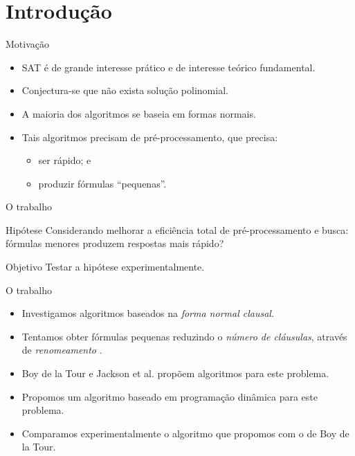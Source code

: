 
\section{Introdução}

\begin{frame}{Motivação}
	\begin{itemize}
		\item SAT é de grande interesse prático \pause e de interesse teórico fundamental.
		\pause\item Conjectura-se que não exista solução polinomial.
		\pause\item A maioria dos algoritmos se baseia em formas normais.
		\pause\item Tais algoritmos precisam de pré-processamento\pause, que precisa:
		\begin{itemize}
			\pause\item ser rápido\pause; e
			\item produzir fórmulas ``pequenas''.
		\end{itemize}
	\end{itemize}
\end{frame}

\begin{frame}{O trabalho}
	\begin{block}{Hipótese}
		Considerando melhorar a eficiência total de pré-processamento e busca: fórmulas menores produzem respostas mais rápido?
	\end{block}
	\pause
	\begin{block}{Objetivo}
		Testar a hipótese experimentalmente.
	\end{block}
\end{frame}

\begin{frame}{O trabalho}
	\begin{itemize}
		\item Investigamos algoritmos baseados na \emph{forma normal clausal}.
		\pause\item Tentamos obter fórmulas pequenas reduzindo o \emph{número de cláusulas}\pause, através de \emph{renomeamento} \cite{plaisted1986structure}.
		\pause\item Boy de la Tour \cite{de1992optimality} e Jackson et al. \cite{jackson2004clause} propõem algoritmos para este problema.
		\pause\item Propomos um algoritmo baseado em programação dinâmica para este problema.
		\pause\item Comparamos experimentalmente o algoritmo que propomos com o de Boy de la Tour.
	\end{itemize}
\end{frame}
